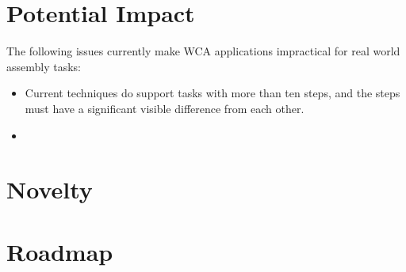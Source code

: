 \section{Potential Impact}

The following issues currently make WCA applications impractical for real world
assembly tasks:
\begin{itemize}
\item Current techniques do support tasks with more than ten steps, and the
  steps must have a significant visible difference from each other.
  \item
\end{itemize}


\section{Novelty}

\section{Roadmap}
